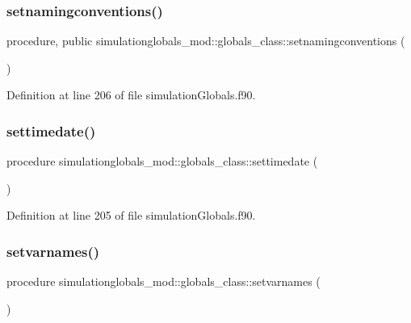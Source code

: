 \subsubsection{\texorpdfstring{setnamingconventions()}{setnamingconventions()}}
{\footnotesize\ttfamily procedure, public simulationglobals\+\_\+mod\+::globals\+\_\+class\+::setnamingconventions (\begin{DoxyParamCaption}{ }\end{DoxyParamCaption})}



Definition at line 206 of file simulation\+Globals.\+f90.

\mbox{\label{structsimulationglobals__mod_1_1globals__class_a9afa580356002f4a94376ad3f925cb35}} 
\subsubsection{\texorpdfstring{settimedate()}{settimedate()}}
{\footnotesize\ttfamily procedure simulationglobals\+\_\+mod\+::globals\+\_\+class\+::settimedate (\begin{DoxyParamCaption}{ }\end{DoxyParamCaption})\hspace{0.3cm}{\ttfamily [private]}}



Definition at line 205 of file simulation\+Globals.\+f90.

\mbox{\label{structsimulationglobals__mod_1_1globals__class_ac9fcf75928fccae1c6ac5c98603ed9b8}} 
\subsubsection{\texorpdfstring{setvarnames()}{setvarnames()}}
{\footnotesize\ttfamily procedure simulationglobals\+\_\+mod\+::globals\+\_\+class\+::setvarnames (\begin{DoxyParamCaption}{ }\end{DoxyParamCaption})\hspace{0.3cm}{\ttfamily [private]}}



